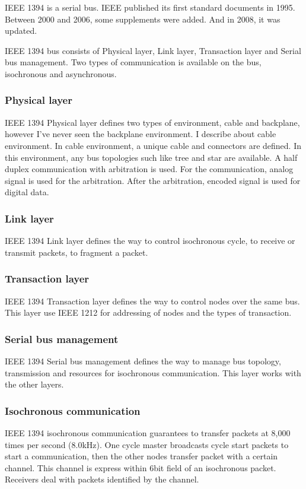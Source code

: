 \documentclass[onecolumn]{article}
\begin{document}
IEEE 1394 is a serial bus. IEEE published its first standard documents in 1995\cite{ieee1394-1}. Between 2000 and 2006, some supplements were added\cite{ieee1394-1-a, ieee1394-1-b, ieee1394-1-c}. And in 2008, it was updated\cite{ieee1394-2}.

IEEE 1394 bus consists of Physical layer, Link layer, Transaction layer and Serial bus management. Two types of communication is available on the bus, isochronous and asynchronous.

\subsubsection{Physical layer}
IEEE 1394 Physical layer defines two types of environment, cable and backplane, however I've never seen the backplane environment. I describe about cable environment. In cable environment, a unique cable and connectors are defined. In this environment, any bus topologies such like tree and star are available. A half duplex communication with arbitration is used. For the communication, analog signal is used for the arbitration. After the arbitration, encoded signal is used for digital data.


\subsubsection{Link layer}
IEEE 1394 Link layer defines the way to control isochronous cycle, to receive or transmit packets, to fragment a packet.


\subsubsection{Transaction layer}
IEEE 1394 Transaction layer defines the way to control nodes over the same bus. This layer use IEEE 1212 for addressing of nodes and the types of transaction.

\subsubsection{Serial bus management}
IEEE 1394 Serial bus management defines the way to manage bus topology, transmission and resources for isochronous communication. This layer works with the other layers.

\subsubsection{Isochronous communication}
IEEE 1394 isochronous communication guarantees to transfer packets at 8,000 times per second (8.0kHz). One cycle master broadcasts cycle start packets to start a communication, then the other nodes transfer packet with a certain channel. This channel is express within 6bit field of an isochronous packet. Receivers deal with packets identified by the channel.
\end{document}
